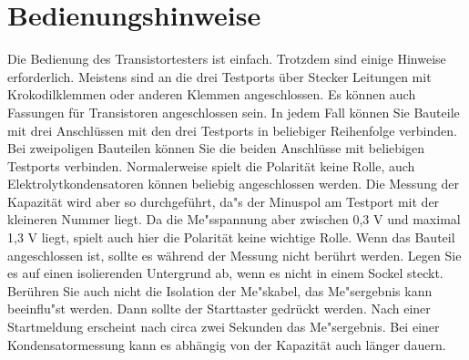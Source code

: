 \chapter{Bedienungshinweise}
\label{sec:manual}
Die Bedienung des Transistortesters ist einfach.
Trotzdem sind einige Hinweise erforderlich.
Meistens sind an die drei Testports \"uber Stecker Leitungen mit Krokodilklemmen oder anderen Klemmen angeschlossen.
Es k\"onnen auch Fassungen f\"ur Transistoren angeschlossen sein.
In jedem Fall k\"onnen Sie Bauteile mit drei Anschl\"ussen mit den drei Testports in beliebiger Reihenfolge verbinden.
Bei zweipoligen Bauteilen k\"onnen Sie die beiden Anschl\"usse mit beliebigen Testports verbinden.
Normalerweise spielt die Polarit\"at keine Rolle, auch Elektrolytkondensatoren k\"onnen beliebig angeschlossen werden.
Die Messung der Kapazit\"at wird aber so durchgef\"uhrt, da"s der Minuspol am Testport mit der kleineren Nummer liegt.
Da die Me"sspannung aber zwischen 0,3 V und maximal 1,3 V liegt, spielt auch hier die Polarit\"at keine wichtige Rolle.
Wenn das Bauteil angeschlossen ist, sollte es w\"ahrend der Messung nicht ber\"uhrt werden. Legen Sie es auf einen
isolierenden Untergrund ab, wenn es nicht in einem Sockel steckt. Ber\"uhren Sie auch nicht die Isolation der Me"skabel,
das Me"sergebnis kann beeinflu"st werden.
Dann sollte der Starttaster gedr\"uckt werden.
Nach einer Startmeldung erscheint nach circa zwei Sekunden das Me"sergebnis. Bei einer Kondensatormessung kann es
abh\"angig von der Kapazit\"at auch l\"anger dauern.


